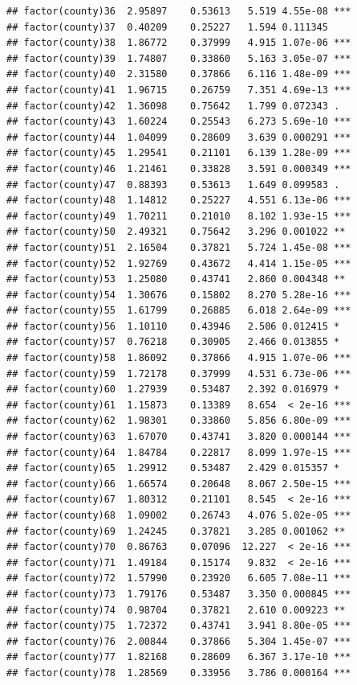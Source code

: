 \documentclass[ignorenonframetext,]{beamer}
\begin{document}
\begin{frame}[fragile]{}
\begin{verbatim}
## factor(county)36  2.95897    0.53613   5.519 4.55e-08 ***
## factor(county)37  0.40209    0.25227   1.594 0.111345    
## factor(county)38  1.86772    0.37999   4.915 1.07e-06 ***
## factor(county)39  1.74807    0.33860   5.163 3.05e-07 ***
## factor(county)40  2.31580    0.37866   6.116 1.48e-09 ***
## factor(county)41  1.96715    0.26759   7.351 4.69e-13 ***
## factor(county)42  1.36098    0.75642   1.799 0.072343 .  
## factor(county)43  1.60224    0.25543   6.273 5.69e-10 ***
## factor(county)44  1.04099    0.28609   3.639 0.000291 ***
## factor(county)45  1.29541    0.21101   6.139 1.28e-09 ***
## factor(county)46  1.21461    0.33828   3.591 0.000349 ***
## factor(county)47  0.88393    0.53613   1.649 0.099583 .  
## factor(county)48  1.14812    0.25227   4.551 6.13e-06 ***
## factor(county)49  1.70211    0.21010   8.102 1.93e-15 ***
## factor(county)50  2.49321    0.75642   3.296 0.001022 ** 
## factor(county)51  2.16504    0.37821   5.724 1.45e-08 ***
## factor(county)52  1.92769    0.43672   4.414 1.15e-05 ***
## factor(county)53  1.25080    0.43741   2.860 0.004348 ** 
## factor(county)54  1.30676    0.15802   8.270 5.28e-16 ***
## factor(county)55  1.61799    0.26885   6.018 2.64e-09 ***
## factor(county)56  1.10110    0.43946   2.506 0.012415 *  
## factor(county)57  0.76218    0.30905   2.466 0.013855 *  
## factor(county)58  1.86092    0.37866   4.915 1.07e-06 ***
## factor(county)59  1.72178    0.37999   4.531 6.73e-06 ***
## factor(county)60  1.27939    0.53487   2.392 0.016979 *  
## factor(county)61  1.15873    0.13389   8.654  < 2e-16 ***
## factor(county)62  1.98301    0.33860   5.856 6.80e-09 ***
## factor(county)63  1.67070    0.43741   3.820 0.000144 ***
## factor(county)64  1.84784    0.22817   8.099 1.97e-15 ***
## factor(county)65  1.29912    0.53487   2.429 0.015357 *  
## factor(county)66  1.66574    0.20648   8.067 2.50e-15 ***
## factor(county)67  1.80312    0.21101   8.545  < 2e-16 ***
## factor(county)68  1.09002    0.26743   4.076 5.02e-05 ***
## factor(county)69  1.24245    0.37821   3.285 0.001062 ** 
## factor(county)70  0.86763    0.07096  12.227  < 2e-16 ***
## factor(county)71  1.49184    0.15174   9.832  < 2e-16 ***
## factor(county)72  1.57990    0.23920   6.605 7.08e-11 ***
## factor(county)73  1.79176    0.53487   3.350 0.000845 ***
## factor(county)74  0.98704    0.37821   2.610 0.009223 ** 
## factor(county)75  1.72372    0.43741   3.941 8.80e-05 ***
## factor(county)76  2.00844    0.37866   5.304 1.45e-07 ***
## factor(county)77  1.82168    0.28609   6.367 3.17e-10 ***
## factor(county)78  1.28569    0.33956   3.786 0.000164 ***

\end{verbatim}
\end{frame}
\end{document}
